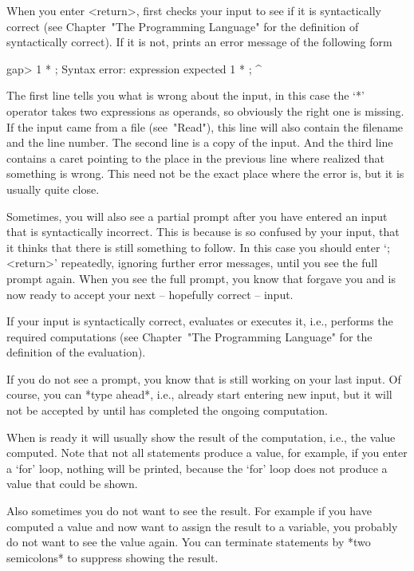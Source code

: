 When you enter <return>, {\GAP} first checks your input to see if it is
syntactically correct (see Chapter~"The Programming Language" for the
definition of syntactically correct). If it is not, {\GAP} prints an
error message of the following form

\begintt
gap> 1 * ;
Syntax error: expression expected
1 * ;
    ^ 
\endtt

The first line tells you what is wrong about the input, in this case the
`*' operator takes two expressions as operands, so obviously the right
one is missing. If the input came from a file (see~"Read"), this line
will also contain the filename and the line number. The second line is a
copy of the input. And the third line contains a caret pointing to the
place in the previous line where {\GAP} realized that something is wrong.
This need not be the exact place where the error is, but it is usually
quite close.

Sometimes, you will also see a partial prompt after you have entered an
input that is syntactically incorrect. This is because {\GAP} is so
confused by your input, that it thinks that there is still something to
follow. In this case you should enter `;<return>' repeatedly, ignoring
further error messages, until you see the full prompt again. When you
see the full prompt, you know that {\GAP} forgave you and is now ready to
accept your next -- hopefully correct -- input.

If your input is syntactically correct, {\GAP} evaluates or executes it,
i.e., performs the required computations (see Chapter~"The Programming
Language" for the definition of the evaluation).

If you do not see a prompt, you know that {\GAP} is still working on your
last input. Of course, you can *type ahead*, i.e., already start
entering new input, but it will not be accepted by {\GAP} until {\GAP}
has completed the ongoing computation.

When {\GAP} is ready it will usually show the result of the computation,
i.e., the value computed. Note that not all statements produce a value,
for example, if you enter a `for' loop, nothing will be printed, because
the `for' loop does not produce a value that could be shown.

Also sometimes you do not want to see the result. For example if you
have computed a value and now want to assign the result to a variable,
you probably do not want to see the value again. You can terminate
statements by *two semicolons* to suppress showing the result.

